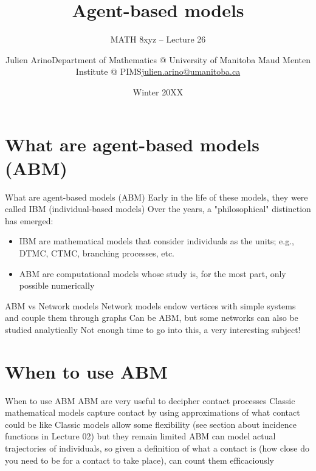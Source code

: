 \documentclass[aspectratio=169]{beamer}\usepackage[]{graphicx}\usepackage[]{xcolor}
\subtitle{MATH 8xyz -- Lecture 26}
\author{\texorpdfstring{Julien Arino\newline Department of Mathematics @ University of Manitoba \newline Maud Menten Institute @ PIMS\newline\url{julien.arino@umanitoba.ca}}{Julien Arino}}
\date{Winter 20XX}
\title{Agent-based models}
\begin{document}



\section{What are agent-based models (ABM)}
\begin{frame}{What are agent-based models (ABM)}
\bbullet Early in the life of these models, they were called IBM (individual-based models)
\bbullet Over the years, a "philosophical" distinction has emerged:
\begin{itemize}
  \item IBM are mathematical models that consider individuals as the units; e.g., DTMC, CTMC, branching processes, etc.
  \item ABM are computational models whose study is, for the most part, only possible numerically
\end{itemize}
\end{frame}

\begin{frame}{ABM vs Network models}
\bbullet Network models endow vertices with simple systems and couple them through graphs
\bbullet Can be ABM, but some networks can also be studied analytically
\bbullet Not enough time to go into this, a very interesting subject!
\end{frame}

\section{When to use ABM}
\begin{frame}{When to use ABM}
\bbullet ABM are very useful to decipher contact processes
\bbullet Classic mathematical models capture contact by using approximations of what contact could be like
\bbullet Classic models allow some flexibility (see section about incidence functions in Lecture 02) but they remain limited
\bbullet ABM can model actual trajectories of individuals, so given a definition of what a contact is (how close do you need to be for a contact to take place), can count them efficaciously
\end{frame}
\end{document}
